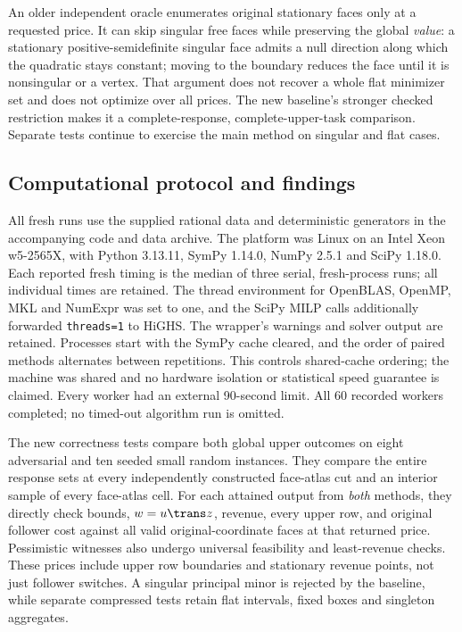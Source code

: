 An older independent oracle enumerates original stationary faces only at a
requested price. It can skip singular free faces while preserving the global
\emph{value}: a stationary positive-semidefinite singular face admits a null
direction along which the quadratic stays constant; moving to the boundary
reduces the face until it is nonsingular or a vertex. That argument does not
recover a whole flat minimizer set and does not optimize over all prices.
The new baseline's stronger checked restriction makes it a complete-response,
complete-upper-task comparison. Separate tests continue to exercise the main
method on singular and flat cases.

\subsection{Computational protocol and findings}\label{subsec:computations}
All fresh runs use the supplied rational data and deterministic generators in
the accompanying code and data archive. The platform was Linux on an Intel
Xeon w5-2565X, with Python 3.13.11, SymPy 1.14.0, NumPy 2.5.1 and SciPy 1.18.0.
Each reported fresh timing is the median of three serial, fresh-process runs;
all individual times are retained. The thread environment for OpenBLAS, OpenMP,
MKL and NumExpr was set to one, and the SciPy MILP calls additionally forwarded
\texttt{threads=1} to HiGHS. The wrapper's warnings and solver output are
retained. Processes start with the SymPy cache cleared, and the order of paired
methods alternates between repetitions. This controls shared-cache ordering;
the machine was shared and no hardware isolation or statistical speed guarantee
is claimed. Every worker had an external 90-second limit. All 60 recorded
workers completed; no timed-out algorithm run is omitted.

The new correctness tests compare both global upper outcomes on eight
adversarial and ten seeded small random instances. They compare the entire
response sets at every independently constructed face-atlas cut and an interior
sample of every face-atlas cell. For each attained output from \emph{both}
methods, they directly check bounds, $w=u\trans z$, revenue, every upper row,
and original follower cost against all valid original-coordinate faces at
that returned price. Pessimistic witnesses also undergo universal feasibility
and least-revenue checks. These prices include upper row boundaries and
stationary revenue points, not just follower switches. A singular principal
minor is rejected by the baseline, while separate compressed tests retain
flat intervals, fixed boxes and singleton aggregates.

